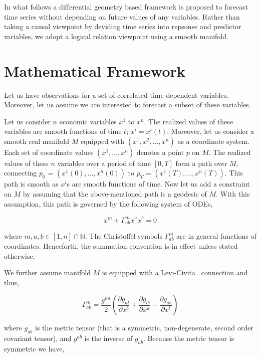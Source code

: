 \documentclass{article}
\begin{document}
In what follows a differential geometry based framework is proposed to
forecast time series without depending on future values of any
variables. Rather than taking a causal viewpoint by deviding time
series into repsonse and predictor variables, we adopt a logical
relation viewpoint using a smooth manifold.

\section{Mathematical Framework}\label{section:mathematical-framework}

Let us have observations for a set of correlated time
dependent variables. Moreover, let us assume we are interested to
forecast a subset of these variables.

Let us consider $n$ economic variables $x^{1}$ to $x^{n}$. The
realized values of these variables are smooth functions of time $t$;
$x^{i} = x^{i}(t)$. Moreover, let us consider a smooth real manifold
$M$ equipped with $(x^{1},x^{2},...,x^{n})$ as a coordinate
system. Each set of coordinate values $(x^{1},...,x^{n})$ denotes a
point $p$ on $M$. The realized values of these $n$ variables over a
period of time $[0,T]$ form a path over $M$, connecting $p_{0}$ =
$(x^{1}(0),...,x^{n}(0))$ to $p_{T}$ = $(x^{1}(T),...,x^{n}(T))$. This
path is smooth as $x^{i}$s are smooth functions of time. Now let us
add a constraint on $M$ by assuming that the above-mentioned path is a
geodesic of $M$. With this assumption, this path is governed by the
following system of ODEs,

\begin{equation}\label{eqn:geodesic}
\ddot{x}^{m} + \Gamma^{m}_{ab} \dot{x}^{a} \dot{x}^{b} = 0
\end{equation}

where $m,a,b \in [1,n] \cap \mathbb{N}$. The Christoffel symbols
$\Gamma^{m}_{ab}$ are in general functions of coordinates. Henceforth,
the summation convention is in effect unless stated otherwise.

We further assume manifold $M$ is equipped with a
Levi-Civita~\cite{deFelice:1990} connection and thus,

\begin{equation}\label{eqn:gamma}
\Gamma^{m}_{ab} = \frac{g^{ml}}{2} ( \frac{\partial g_{al}}{\partial
  x^{b}} + \frac{\partial g_{lb}}{\partial x^{a}} - \frac{\partial
  g_{ab}}{\partial x^{l}} )
\end{equation}

where $g_{ab}$ is the metric tensor (that is a symmetric,
non-degenerate, second order covariant tensor), and $g^{ab}$ is the
inverse of $g_{ab}$. Because the metric tensor is symmetric we have,
\end{document}
